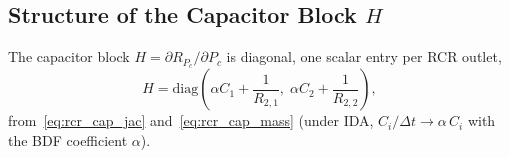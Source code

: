 \documentclass[11pt]{article}
\begin{document}
\subsection{Structure of the Capacitor Block $H$}

The capacitor block $H=\partial R_{P_c}/\partial P_c$ is diagonal, one scalar
entry per RCR outlet,
\begin{equation}
H
=
\mathrm{diag}\!\left(
\alpha C_1+\frac{1}{R_{2,1}},\;
\alpha C_2+\frac{1}{R_{2,2}}
\right),
\label{eq:H_block}
\end{equation}
from~\eqref{eq:rcr_cap_jac} and~\eqref{eq:rcr_cap_mass} (under IDA,
$C_i/\Delta t \to \alpha\,C_i$ with the BDF coefficient $\alpha$).


\end{document}
